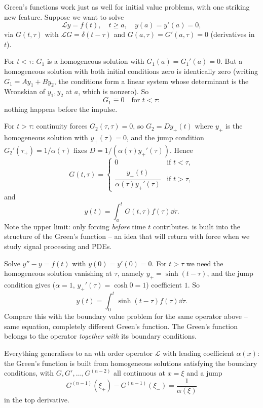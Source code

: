 Green's functions work just as well for initial value problems, with one striking new feature. Suppose we want to solve
$$
\mathcal{L}y = f(t), \quad t \geq a, \quad y(a) = y'(a) = 0,
$$
via $G(t, \tau)$ with $\mathcal{L}G = \delta(t - \tau)$ and $G(a, \tau) = G'(a, \tau) = 0$ (derivatives in $t$).

For $t < \tau$: $G_1$ is a homogeneous solution with $G_1(a) = G_1'(a) = 0$. But a homogeneous solution with both initial conditions zero is identically zero (writing $G_1 = A y_1 + B y_2$, the conditions form a linear system whose determinant is the Wronskian of $y_1, y_2$ at $a$, which is nonzero). So
$$
G_1 \equiv 0 \quad \text{for } t < \tau:
$$
nothing happens before the impulse.

For $t > \tau$: continuity forces $G_2(\tau, \tau) = 0$, so $G_2 = D y_+(t)$ where $y_+$ is the homogeneous solution with $y_+(\tau) = 0$, and the jump condition $G_2'(\tau_+) = 1/\alpha(\tau)$ fixes $D = 1/(\alpha(\tau) y_+'(\tau))$. Hence
$$
G(t, \tau) = \begin{cases}
    0 &\mbox{if } t < \tau, \\[0.5ex]
    \dfrac{y_+(t)}{\alpha(\tau) y_+'(\tau)} &\mbox{if } t > \tau,
\end{cases}
$$
and
$$
y(t) = \int_a^t G(t, \tau) f(\tau) \dd \tau.
$$
Note the upper limit: only forcing \emph{before} time $t$ contributes.  is built into the structure of the Green's function -- an idea that will return with force when we study signal processing and PDEs.

\begin{example}
    Solve $y'' - y = f(t)$ with $y(0) = y'(0) = 0$.
    For $t > \tau$ we need the homogeneous solution vanishing at $\tau$, namely $y_+ = \sinh(t - \tau)$, and the jump condition gives ($\alpha = 1$, $y_+'(\tau) = \cosh 0 = 1$) coefficient $1$. So
    $$
    y(t) = \int_0^t \sinh(t - \tau) f(\tau) \dd \tau.
    $$
    Compare this with the boundary value problem for the same operator above -- same equation, completely different Green's function. The Green's function belongs to the operator \emph{together with} its boundary conditions.
\end{example}

\begin{remark}
    Everything generalises to an $n$th order operator $\mathcal{L}$ with leading coefficient $\alpha(x)$: the Green's function is built from homogeneous solutions satisfying the boundary conditions, with $G, G', \dots, G^{(n - 2)}$ all continuous at $x = \xi$ and a jump
    $$
    G^{(n-1)}(\xi_+) - G^{(n - 1)}(\xi_-) = \frac{1}{\alpha(\xi)}
    $$
    in the top derivative.
\end{remark}

